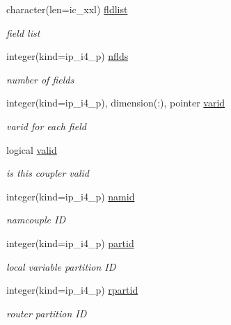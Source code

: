 \begin{DoxyCompactItemize}
character(len=ic\+\_\+xxl) \hyperlink{structmod__oasis__coupler_1_1prism__coupler__type_a8fa15fcf7d475ade7879d64b4aeb9188}{fldlist}
\begin{DoxyCompactList}\small\item\em field list \end{DoxyCompactList}\item 
integer(kind=ip\+\_\+i4\+\_\+p) \hyperlink{structmod__oasis__coupler_1_1prism__coupler__type_a08fa25cab6817cfbc0c660a4f51d3857}{nflds}
\begin{DoxyCompactList}\small\item\em number of fields \end{DoxyCompactList}\item 
integer(kind=ip\+\_\+i4\+\_\+p), dimension(\+:), pointer \hyperlink{structmod__oasis__coupler_1_1prism__coupler__type_a9e31592685ea4cb2da222187ee2ffa4b}{varid}
\begin{DoxyCompactList}\small\item\em varid for each field \end{DoxyCompactList}\item 
logical \hyperlink{structmod__oasis__coupler_1_1prism__coupler__type_aceee78ca0ec709406b404ff29e1fcf18}{valid}
\begin{DoxyCompactList}\small\item\em is this coupler valid \end{DoxyCompactList}\item 
integer(kind=ip\+\_\+i4\+\_\+p) \hyperlink{structmod__oasis__coupler_1_1prism__coupler__type_a68ccbd8305f8c1016a9025558ab8dea5}{namid}
\begin{DoxyCompactList}\small\item\em namcouple ID \end{DoxyCompactList}\item 
integer(kind=ip\+\_\+i4\+\_\+p) \hyperlink{structmod__oasis__coupler_1_1prism__coupler__type_a5506dc46a0c8def7417a6e2a9c046474}{partid}
\begin{DoxyCompactList}\small\item\em local variable partition ID \end{DoxyCompactList}\item 
integer(kind=ip\+\_\+i4\+\_\+p) \hyperlink{structmod__oasis__coupler_1_1prism__coupler__type_a1bf4a986a745318b93d46612b95b0489}{rpartid}
\begin{DoxyCompactList}\small\item\em router partition ID \end{DoxyCompactList}\item 

\end{DoxyCompactItemize}
